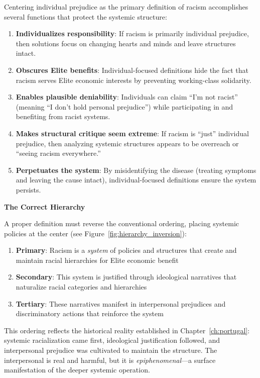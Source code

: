 Centering individual prejudice as the primary definition of racism accomplishes several functions that protect the systemic structure:

\begin{enumerate}
    \item \textbf{Individualizes responsibility}: If racism is primarily individual prejudice, then solutions focus on changing hearts and minds and leave structures intact.
    
    \item \textbf{Obscures Elite benefits}: Individual-focused definitions hide the fact that racism serves Elite economic interests by preventing working-class solidarity.
    
    \item \textbf{Enables plausible deniability}: Individuals can claim ``I'm not racist'' (meaning ``I don't hold personal prejudice'') while participating in and benefiting from racist systems.
    
    \item \textbf{Makes structural critique seem extreme}: If racism is ``just'' individual prejudice, then analyzing systemic structures appears to be overreach or ``seeing racism everywhere.''
    
    \item \textbf{Perpetuates the system}: By misidentifying the disease (treating symptoms and leaving the cause intact), individual-focused definitions ensure the system persists.
\end{enumerate}

\textbf{The Correct Hierarchy}

A proper definition must reverse the conventional ordering, placing systemic policies at the center (see Figure~\ref{fig:hierarchy_inversion}):

\begin{enumerate}
    \item \textbf{Primary}: Racism is a \textit{system} of policies and structures that create and maintain racial hierarchies for Elite economic benefit
    \item \textbf{Secondary}: This system is justified through ideological narratives that naturalize racial categories and hierarchies
    \item \textbf{Tertiary}: These narratives manifest in interpersonal prejudices and discriminatory actions that reinforce the system
\end{enumerate}

This ordering reflects the historical reality established in Chapter~\ref{ch:portugal}: systemic racialization came first, ideological justification followed, and interpersonal prejudice was cultivated to maintain the structure. The interpersonal is real and harmful, but it is \textit{epiphenomenal}---a surface manifestation of the deeper systemic operation.

